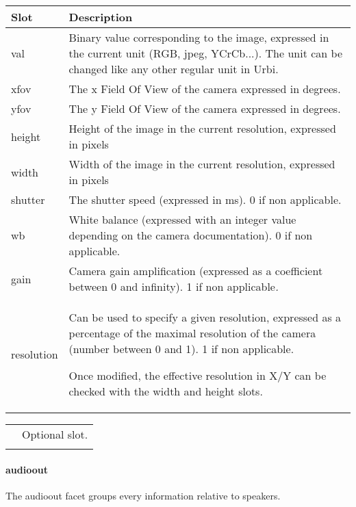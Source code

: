 \documentclass[a4paper]{article}
\begin{document}
\begin{flushleft}
\tablehead{}
\begin{supertabular}{|m{3.293cm}|m{11.997cm}|}
\hline
\sffamily\bfseries Slot &
\sffamily\bfseries Description\\\hline
val &
\sffamily Binary value corresponding to the
image, expressed in the current unit (RGB, jpeg, YCrCb...). The unit
can be changed like any other regular unit in Urbi. \\\hline
xfov &
\sffamily The x Field Of View of the camera
expressed in degrees.\\\hline
yfov &
\sffamily The y Field Of View of the camera
expressed in degrees.\\\hline
height &
\sffamily Height of the image in the current
resolution, expressed in pixels\\\hline
width &
\sffamily Width of the image in the current
resolution, expressed in pixels\\\hline
shutter &
\textsf{The shutter speed }\textsf{(expressed
in ms). 0 if non applicable.}\\\hline
wb &
\textsf{White balance }\textsf{(expressed with
an integer value depending on the camera documentation). 0 if non
applicable.}\\\hline
gain &
\textsf{Camera gain amplification
}\textsf{(expressed as a coefficient between 0 and infinity). 1 if non
applicable}\textsf{\textit{.}}\\\hline
resolution &
 Can be used to specify a given
resolution, expressed as a percentage of the maximal resolution of the
camera (number between 0 and 1). 1 if non applicable.

\sffamily Once modified, the effective
resolution in X/Y can be checked with the width and height
slots.\\\hline
\end{supertabular}
\end{flushleft}
\begin{flushleft}
\tablehead{}
\begin{supertabular}{|m{1.717cm}|m{10.464cm}}
\hhline{-~}
 &
Optional slot.\\\hhline{-~}
\end{supertabular}
\end{flushleft}
\paragraph{audioout}


The audioout facet groups every information relative to speakers.
\end{document}
